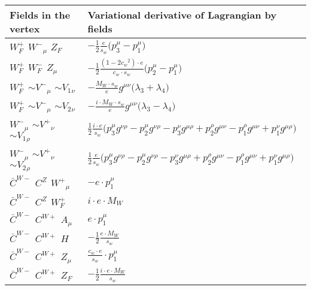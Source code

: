 \begin{center}
\begin{tabular}{|l|l|} \hline
Fields in the vertex & Variational derivative of Lagrangian by fields \\ \hline
$W^+_F{}_{}$ \phantom{-} $W^-{}_{\mu }$ \phantom{-} $Z_F{}_{}$ \phantom{-}  &
	$-\frac{1}{2}\frac{ e}{ s_w}\big(p_3^\mu -p_1^\mu \big)$\\[2mm]
$W^+_F{}_{}$ \phantom{-} $W^-_F{}_{}$ \phantom{-} ${Z}_{\mu }$ \phantom{-}  &
	$-\frac{1}{2}\frac{ (1-2 c_w {}^2) \cdot e}{ c_w \cdot s_w}\big(p_2^\mu -p_1^\mu \big)$\\[2mm]
$W^+_F{}_{}$ \phantom{-} $\sim V^-{}_{\mu }$ \phantom{-} $\sim V_1{}_{\nu }$ \phantom{-}  &
	$-\frac{ M_W \cdot s_w}{ e}g^{\mu \nu} \big( \lambda_3+ \lambda_4\big)$\\[2mm]
$W^+_F{}_{}$ \phantom{-} $\sim V^-{}_{\mu }$ \phantom{-} $\sim V_2{}_{\nu }$ \phantom{-}  &
	$-\frac{ i \cdot M_W \cdot s_w}{ e}g^{\mu \nu} \big( \lambda_3- \lambda_4\big)$\\[2mm]
$W^-{}_{\mu }$ \phantom{-} $\sim V^+{}_{\nu }$ \phantom{-} $\sim V_1{}_{\rho }$ \phantom{-}  &
	$\frac{1}{2}\frac{ i \cdot e}{ s_w}\big(p_3^\mu g^{\nu \rho} -p_2^\mu g^{\nu \rho} -p_3^\nu g^{\mu \rho} +p_2^\rho g^{\mu \nu} -p_1^\rho g^{\mu \nu} +p_1^\nu g^{\mu \rho} \big)$\\[2mm]
$W^-{}_{\mu }$ \phantom{-} $\sim V^+{}_{\nu }$ \phantom{-} $\sim V_2{}_{\rho }$ \phantom{-}  &
	$\frac{1}{2}\frac{ e}{ s_w}\big(p_3^\mu g^{\nu \rho} -p_2^\mu g^{\nu \rho} -p_3^\nu g^{\mu \rho} +p_2^\rho g^{\mu \nu} -p_1^\rho g^{\mu \nu} +p_1^\nu g^{\mu \rho} \big)$\\[2mm]
$\bar{C}^{W-}{}_{}$ \phantom{-} $C^{Z}{}_{}$ \phantom{-} $W^+{}_{\mu }$ \phantom{-}  &
	$- e\cdot p_1^\mu $\\[2mm]
$\bar{C}^{W-}{}_{}$ \phantom{-} $C^{Z}{}_{}$ \phantom{-} $W^+_F{}_{}$ \phantom{-}  &
	$ i \cdot e \cdot M_W$\\[2mm]
$\bar{C}^{W-}{}_{}$ \phantom{-} $C^{W+}{}_{}$ \phantom{-} ${A}_{\mu }$ \phantom{-}  &
	$ e\cdot p_1^\mu $\\[2mm]
$\bar{C}^{W-}{}_{}$ \phantom{-} $C^{W+}{}_{}$ \phantom{-} ${H}_{}$ \phantom{-}  &
	$-\frac{1}{2}\frac{ e \cdot M_W}{ s_w}$\\[2mm]
$\bar{C}^{W-}{}_{}$ \phantom{-} $C^{W+}{}_{}$ \phantom{-} ${Z}_{\mu }$ \phantom{-}  &
	$\frac{ c_w \cdot e}{ s_w}\cdot p_1^\mu $\\[2mm]
$\bar{C}^{W-}{}_{}$ \phantom{-} $C^{W+}{}_{}$ \phantom{-} $Z_F{}_{}$ \phantom{-}  &
	$-\frac{1}{2}\frac{ i \cdot e \cdot M_W}{ s_w}$\\[2mm]

\end{tabular}
\end{center}
